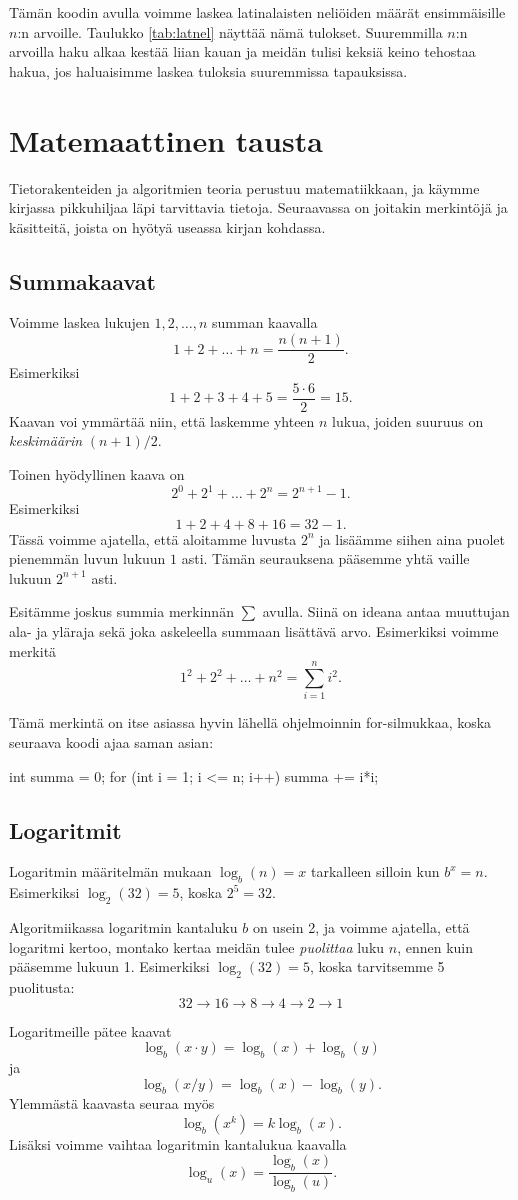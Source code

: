 Tämän koodin avulla voimme laskea latinalaisten neliöiden
määrät ensimmäisille $n$:n arvoille.
Taulukko \ref{tab:latnel} näyttää nämä tulokset.
Suuremmilla $n$:n arvoilla haku alkaa kestää liian kauan
ja meidän tulisi keksiä keino tehostaa hakua,
jos haluaisimme laskea tuloksia suuremmissa tapauksissa.

\section{Matemaattinen tausta}

Tietorakenteiden ja algoritmien teoria perustuu matematiikkaan,
ja käym\-me kirjassa pikkuhiljaa läpi tarvittavia tietoja.
Seuraavassa on joitakin merkintöjä ja käsitteitä, joista on hyötyä
useassa kirjan kohdassa.

\subsection{Summakaavat}

Voimme laskea lukujen $1,2,\dots,n$ summan kaavalla
\[1+2+\dots+n = \frac{n(n+1)}{2}.\]
Esimerkiksi
\[1+2+3+4+5 = \frac{5 \cdot 6}{2}=15.\]
Kaavan voi ymmärtää niin, että laskemme yhteen $n$ lukua,
joiden suuruus on \emph{keskimäärin} $(n+1)/2$.

Toinen hyödyllinen kaava on
\[2^0+2^1+\dots+2^n = 2^{n+1}-1.\]
Esimerkiksi
\[1+2+4+8+16=32-1.\]
Tässä voimme ajatella, että aloitamme luvusta $2^n$
ja lisäämme siihen aina puolet pienemmän luvun lukuun $1$ asti.
Tämän seurauksena pääsemme yhtä vaille lukuun $2^{n+1}$ asti.

Esitämme joskus summia merkinnän $\sum$ avulla.
Siinä on ideana antaa muuttujan ala- ja yläraja sekä
joka askeleella summaan lisättävä arvo.
Esimerkiksi voimme merkitä
\[1^2 + 2^2 + \dots + n^2 = \sum_{i=1}^n i^2.\]

Tämä merkintä on itse asiassa hyvin lähellä ohjelmoinnin
for-silmukkaa, koska seuraava koodi ajaa saman asian:

\begin{code}
int summa = 0;
for (int i = 1; i <= n; i++) {
    summa += i*i;
}
\end{code}

\subsection{Logaritmit}

Logaritmin määritelmän mukaan $\log_b(n)=x$
tarkalleen silloin kun $b^x=n$.
Esimerkiksi $\log_2(32)=5$, koska $2^5=32$.

Algoritmiikassa logaritmin kantaluku $b$ on usein 2,
ja voimme ajatella, että logaritmi kertoo, montako kertaa
meidän tulee \emph{puolittaa} luku $n$, ennen kuin pääsemme lukuun 1.
Esimerkiksi $\log_2(32)=5$, koska tarvitsemme 5 puolitusta:
\[32 \rightarrow 16 \rightarrow 8 \rightarrow 4 \rightarrow 2 \rightarrow 1\]

Logaritmeille pätee kaavat
\[\log_b(x \cdot y) = \log_b(x)+\log_b(y)\]
ja
\[\log_b(x / y) = \log_b(x)-\log_b(y).\]
Ylemmästä kaavasta seuraa myös
\[\log_b(x^k) = k \log_b(x).\]
Lisäksi voimme vaihtaa logaritmin kantalukua kaavalla
\[\log_u(x) = \frac{\log_b(x)}{\log_b(u)}.\]